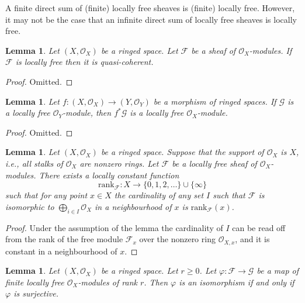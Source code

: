 \documentclass{stacks-project}
\theoremstyle{plain}
\newtheorem{lemma}[subsection]{Lemma}
\theoremstyle{definition}
\theoremstyle{remark}
\numberwithin{equation}{subsection}
\begin{document}
\noindent
A finite direct sum of (finite) locally free sheaves is (finite)
locally free. However, it may not be the case that an infinite direct
sum of locally free sheaves is locally free.

\begin{lemma}
\label{lemma-locally-free-quasi-coherent}
Let $(X, \mathcal{O}_X)$ be a ringed space.
Let $\mathcal{F}$ be a sheaf of $\mathcal{O}_X$-modules.
If $\mathcal{F}$ is locally free then it is quasi-coherent.
\end{lemma}

\begin{proof}
Omitted.
\end{proof}

\begin{lemma}
\label{lemma-pullback-locally-free}
Let $f : (X, \mathcal{O}_X) \to (Y, \mathcal{O}_Y)$
be a morphism of ringed spaces. If $\mathcal{G}$ is
a locally free $\mathcal{O}_Y$-module, then
$f^*\mathcal{G}$ is a locally free $\mathcal{O}_X$-module.
\end{lemma}

\begin{proof}
Omitted.
\end{proof}

\begin{lemma}
\label{lemma-rank}
Let $(X, \mathcal{O}_X)$ be a ringed space.
Suppose that the support of $\mathcal{O}_X$ is $X$,
i.e., all stalks of $\mathcal{O}_X$ are nonzero rings.
Let $\mathcal{F}$ be a locally free sheaf of $\mathcal{O}_X$-modules.
There exists a locally constant function
$$
\text{rank}_\mathcal{F} :
X \longrightarrow \{0, 1, 2, \ldots\}\cup\{\infty\}
$$
such that for any point $x \in X$ the cardinality of any
set $I$ such that $\mathcal{F}$ is isomorphic to
$\bigoplus_{i\in I} \mathcal{O}_X$ in a neighbourhood
of $x$ is $\text{rank}_\mathcal{F}(x)$.
\end{lemma}

\begin{proof}
Under the assumption of the lemma the cardinality of $I$ can be read off
from the rank of the free module $\mathcal{F}_x$ over the nonzero ring
$\mathcal{O}_{X, x}$, and it is constant in a neighbourhood of $x$.
\end{proof}

\begin{lemma}
\label{lemma-map-finite-locally-free}
Let $(X, \mathcal{O}_X)$ be a ringed space. Let $r \geq 0$.
Let $\varphi : \mathcal{F} \to \mathcal{G}$ be a map of finite
locally free $\mathcal{O}_X$-modules of rank $r$.
Then $\varphi$ is an isomorphism if and only if $\varphi$
is surjective.
\end{lemma}
\end{document}
